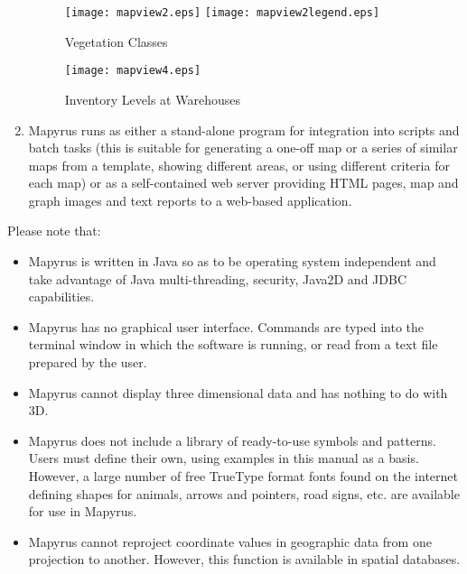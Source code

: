 \begin{enumerate}
\begin{figure}
\texttt{[image: mapview2.eps]}
\texttt{[image: mapview2legend.eps]}
\caption{Vegetation Classes}
\label{mapview2}
\end{figure}

\begin{figure}
\texttt{[image: mapview4.eps]}
\caption{Inventory Levels at Warehouses}
\label{mapview4}
\end{figure}

\item
Mapyrus runs as either
a stand-alone program for integration into
scripts and batch tasks  (this is suitable for generating a one-off
map or a series of similar maps from a template,
showing different areas, or using different criteria for each map)
or as a self-contained web server providing HTML pages, map and
graph images and text reports to a web-based application.

\end{enumerate}

Please note that:

\begin{itemize}
\item
Mapyrus is written in Java so as to be operating system independent
and take advantage of Java multi-threading, security,
Java2D and JDBC capabilities.

\item
Mapyrus has no graphical user interface.
Commands are typed into the terminal window in which the software is running,
or read from a text file prepared by the user.

\item
Mapyrus cannot display three dimensional data and has nothing to do
with 3D.

\item
Mapyrus does not include a library of ready-to-use symbols and patterns.
Users must define their own, using examples in this manual as a basis.
However, a large number of free TrueType format fonts found on the internet
defining shapes for animals, arrows and pointers, road signs, etc. are
available for use in Mapyrus.

\item
Mapyrus cannot reproject coordinate values in geographic data from
one projection to another.  However, this function is available in spatial
databases.
\end{itemize}

